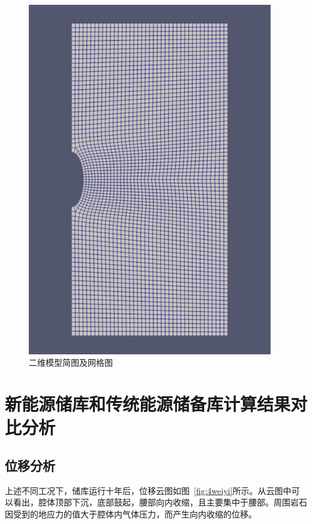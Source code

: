 \begin{figure}[ht!]
{\begin{minipage}{7cm}
            \includegraphics[width=0.95\textwidth]{img/chap5/二维网格.pdf}
        \end{minipage}
    }
    \caption{二维模型简图及网格图}
    \label{fig:2dmodel}
\end{figure}

\section{新能源储库和传统能源储备库计算结果对比分析}

\subsection{位移分析}

上述不同工况下，储库运行十年后，位移云图如图~\ref{fig:4weiyi}所示。从云图中可以看出，腔体顶部下沉，底部鼓起，腰部向内收缩，且主要集中于腰部。周围岩石因受到的地应力的值大于腔体内气体压力，而产生向内收缩的位移。

